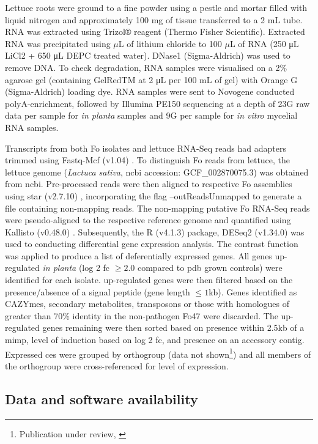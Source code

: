 Lettuce roots were ground to a fine powder using a pestle and mortar filled with liquid nitrogen and approximately 100 mg of tissue transferred to a 2 mL tube. RNA was extracted using Trizol® reagent (Thermo Fisher Scientific). Extracted RNA was precipitated using \(\mu\)L of lithium chloride to 100 \(\mu\)L of RNA (250 μL LiCl2 + 650 μL DEPC treated water). DNase1 (Sigma-Aldrich) was used to remove DNA. To check degradation, RNA samples were visualised on a 2\% agarose gel (containing GelRedTM at 2 μL per 100 mL of gel) with Orange G (Sigma-Aldrich) loading dye. RNA samples were sent to  Novogene conducted polyA-enrichment, followed by Illumina PE150 sequencing at a depth of 23G raw data per sample for \textit{in planta} samples and 9G per sample for \textit{in vitro} mycelial RNA samples.

Transcripts from both \ac{Fo} isolates and lettuce RNA-Seq reads had adapters trimmed using Fastq-Mcf (v1.04) \parencite{Aronesty2013}. To distinguish \ac{Fo} reads from lettuce, the lettuce genome (\textit{Lactuca sativa}, \ac{ncbi} accession: GCF\_002870075.3) was obtained from \ac{ncbi}. Pre-processed reads were then aligned to respective \ac{Fo} assemblies using \ac{star} (v2.7.10) \parencite{Dobin2013}, incorporating the flag --outReadsUnmapped to generate a file containing non-mapping reads. The non-mapping putative \ac{Fo} RNA-Seq reads were pseudo-aligned to the respective reference genome and quantified using Kallisto (v0.48.0) \parencite{Bray2016}. Subsequently, the R (v4.1.3) \parencite{R} package, DESeq2 (v1.34.0) \parencite{Love2014} was used to conducting differential gene expression analysis. The contrast function was applied to produce a list of deferentially expressed genes. All genes up-regulated \textit{in planta} (log 2 \ac{fc} $\ge2.0$ compared to \ac{pdb} grown controls) were identified for each isolate. up-regulated genes were then filtered based on the presence/absence of a signal peptide (gene length $\le1$kb). Genes identified as CAZYmes, secondary metabolites, transposons or those with homologues of greater than 70\% identity in the non-pathogen Fo47 were discarded. The up-regulated genes remaining were then sorted based on presence within 2.5kb of a \ac{mimp}, level of induction based on log 2 \ac{fc}, and presence on an accessory contig. Expressed \acp{ce} were grouped by orthogroup (data not shown\footnote{Publication under review, \textcite{FolaManuscript}}) and all members of the orthogroup were cross-referenced for level of expression. 

\subsection{Data and software availability}

